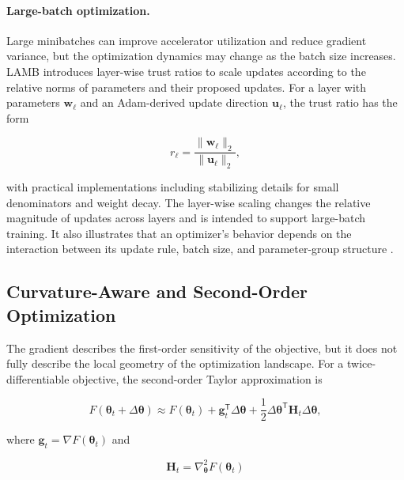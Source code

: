 \paragraph{Large-batch optimization.}
Large minibatches can improve accelerator utilization and reduce
gradient variance, but the optimization dynamics may change as the
batch size increases. LAMB introduces layer-wise trust ratios to
scale updates according to the relative norms of parameters and
their proposed updates. For a layer with parameters
$\mathbf{w}_{\ell}$ and an Adam-derived update direction
$\mathbf{u}_{\ell}$, the trust ratio has the form

\begin{equation}
    r_{\ell}
    =
    \frac{\|\mathbf{w}_{\ell}\|_2}
         {\|\mathbf{u}_{\ell}\|_2},
    \label{eq:opt-lamb-trust-ratio}
\end{equation}

with practical implementations including stabilizing details for
small denominators and weight decay. The layer-wise scaling changes
the relative magnitude of updates across layers and is intended to
support large-batch training. It also illustrates that an optimizer's
behavior depends on the interaction between its update rule, batch
size, and parameter-group structure
\parencite{Ranganath2026Navigating}.

\subsection{Curvature-Aware and Second-Order Optimization}
\label{subsec:optimization-second-order}

The gradient describes the first-order sensitivity of the objective,
but it does not fully describe the local geometry of the optimization
landscape. For a twice-differentiable objective, the second-order
Taylor approximation is

\begin{equation}
    F(\boldsymbol{\theta}_t+\Delta\boldsymbol{\theta})
    \approx
    F(\boldsymbol{\theta}_t)
    +
    \mathbf{g}_t^{\mathsf{T}}\Delta\boldsymbol{\theta}
    +
    \frac{1}{2}
    \Delta\boldsymbol{\theta}^{\mathsf{T}}
    \mathbf{H}_t
    \Delta\boldsymbol{\theta},
    \label{eq:opt-second-order-taylor}
\end{equation}

where $\mathbf{g}_t=\nabla F(\boldsymbol{\theta}_t)$ and

\begin{equation}
    \mathbf{H}_t
    =
    \nabla_{\boldsymbol{\theta}}^2F(\boldsymbol{\theta}_t)
    \label{eq:opt-hessian}
\end{equation}


